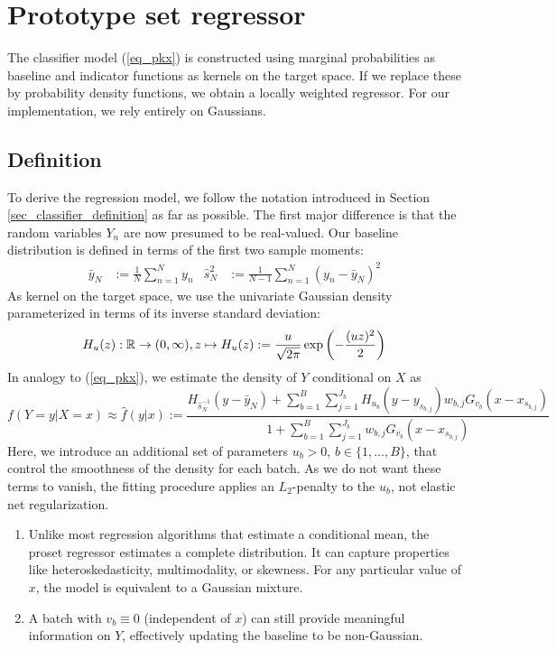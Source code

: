\chapter{Prototype set regressor}
\label{ch_regressors}
%
The classifier model (\ref{eq_pkx}) is constructed using marginal probabilities as baseline and indicator functions as kernels on the target space.
If we replace these by probability density functions, we obtain a locally weighted regressor.
For our implementation, we rely entirely on Gaussians.
%
\section{Definition}
\label{sec_regressor_definition}
%
To derive the regression model, we follow the notation introduced in Section \ref{sec_classifier_definition} as far as possible.
The first major difference is that the random variables $Y_n$ are now presumed to be real-valued.
Our baseline distribution is defined in terms of the first two sample moments:
%
\begin{align}
\bar{y}_N&:=\frac{1}{N}\sum_{n=1}^Ny_n&
\hat{s}^2_N&:=\frac{1}{N-1}\sum_{n=1}^N(y_n-\bar{y}_N)^2
\label{eq_y_moments}
\end{align}
%
As kernel on the target space, we use the univariate Gaussian density parameterized in terms of its inverse standard deviation:
%
\begin{equation}
H_u(z):\mathbb{R}\rightarrow(0,\infty),z\mapsto H_u(z):=\frac{u}{\sqrt{2\pi}}\exp\left(-\frac{(uz)^2}{2}\right)\label{eq_kernel_2}
\end{equation}
%
In analogy to (\ref{eq_pkx}), we estimate the density of $Y$ conditional on $X$ as
%
\begin{equation}
f(Y=y|X=x)\approx\hat{f}(y|x):=
\frac{H_{\hat{s}^{-1}_N}(y-\bar{y}_N)+\sum_{b=1}^B\sum_{j=1}^{J_b}H_{u_b}(y-y_{s_{b,j}})w_{b,j}G_{v_b}(x-x_{s_{b,j}})}
{1+\sum_{b=1}^B\sum_{j=1}^{J_b}w_{b,j}G_{v_b}(x-x_{s_{b,j}})}
\label{eq_fyx}
\end{equation}
%
Here, we introduce an additional set of parameters $u_b>0$, $b\in\{1,\dots,B\}$, that control the smoothness of the density for each batch.
As we do not want these terms to vanish, the fitting procedure applies an $L_2$-penalty to the $u_b$, not elastic net regularization.
%
\begin{remark}
\begin{enumerate}
\item Unlike most regression algorithms that estimate a conditional mean, the proset regressor estimates a complete distribution.
It can capture properties like heteroskedasticity, multimodality, or skewness.
For any particular value of $x$, the model is equivalent to a Gaussian mixture.
%
\item A batch with $v_b\equiv0$ (independent of $x$) can still provide meaningful information on $Y$, effectively updating the baseline to be non-Gaussian.
\end{enumerate}
\end{remark}
%
\endinput
